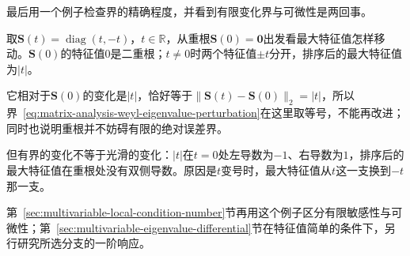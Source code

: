 最后用一个例子检查界的精确程度，并看到有限变化界与可微性是两回事。
\begin{example}[重根处的最大特征值]
\label{ex:ls-weyl-double-root}
取$\bm S(t)=\operatorname{diag}(t,-t)$，$t\in\mathbb R$，从重根$\bm S(0)=\bm0$出发看最大特征值怎样移动。$\bm S(0)$的特征值$0$是二重根；$t\neq0$时两个特征值$\pm t$分开，排序后的最大特征值为$|t|$。

它相对于$\bm S(0)$的变化是$|t|$，恰好等于$\lVert\bm S(t)-\bm S(0)\rVert_2=|t|$，所以界~\eqref{eq:matrix-analysis-weyl-eigenvalue-perturbation}在这里取等号，不能再改进；同时也说明重根并不妨碍有限的绝对误差界。

但有界的变化不等于光滑的变化：$|t|$在$t=0$处左导数为$-1$、右导数为$1$，排序后的最大特征值在重根处没有双侧导数。原因是$t$变号时，最大特征值从$t$这一支换到$-t$那一支。
\end{example}
第~\ref{sec:multivariable-local-condition-number}节再用这个例子区分有限敏感性与可微性；第~\ref{sec:multivariable-eigenvalue-differential}节在特征值简单的条件下，另行研究所选分支的一阶响应。
